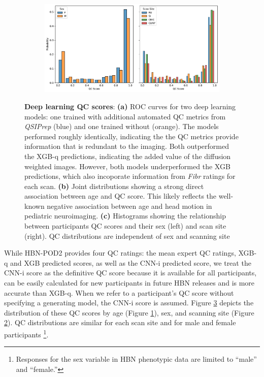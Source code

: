 \documentclass[fleqn,10pt]{wlscirep}
\begin{document}
\begin{figure}[htbp]
\begin{subfigure}{.25\textwidth}
    \caption{}
    \label{fig:dl-qc:joint}
    \end{subfigure}
    \begin{subfigure}{.5\textwidth}
    \centering
    \includegraphics[width=\linewidth]{bundle-profiles/qc-hist.pdf}
    \caption{}
    \label{fig:dl-qc:hist}
    \end{subfigure}
    \caption{%
        {\bf Deep learning QC scores}:
        \textbf{(a)} ROC curves for two deep learning models: one trained with
        additional automated QC metrics from \emph{QSIPrep} (blue) and one
        trained without (orange). The models performed roughly identically,
        indicating the the QC metrics provide information that is redundant to
        the imaging. Both outperformed the XGB-q predictions, indicating the
        added value of the diffusion weighted images. However, both models
        underperformed the XGB predictions, which also incoporate
        information from \emph{Fibr} ratings for each scan.
        \textbf{(b)} Joint distributions showing a strong direct association
        between age and QC score. This likely reflects the well-known negative
        association between age and head motion in pediatric neuroimaging.
        \textbf{(c)}
        Histograms showing the relationship between participants QC scores and
        their sex (left) and scan site (right). QC distributions are independent
        of sex and scanning site
    }
    \label{fig:dl-qc}
\end{figure}

While HBN-POD2 provides four QC ratings: the mean expert QC ratings, XGB-q and
XGB predicted scores, as well as the CNN-i predicted score, we treat the CNN-i
score as the definitive QC score because it is available for all participants,
can be easily calculated for new participants in future HBN releases and is more
accurate than XGB-q. When we refer to a participant's QC score without
specifying a generating model, the CNN-i score is assumed. Figure
\ref{fig:dl-qc} depicts the distribution of these QC scores by age (Figure
\ref{fig:dl-qc:joint}), sex, and scanning site (Figure \ref{fig:dl-qc:hist}). QC
distributions are similar for each scan site and for male and female
participants \footnote{%
    Responses for the sex variable in HBN phenotypic data are limited to
    ``male'' and ``female.''
}.
\end{document}
